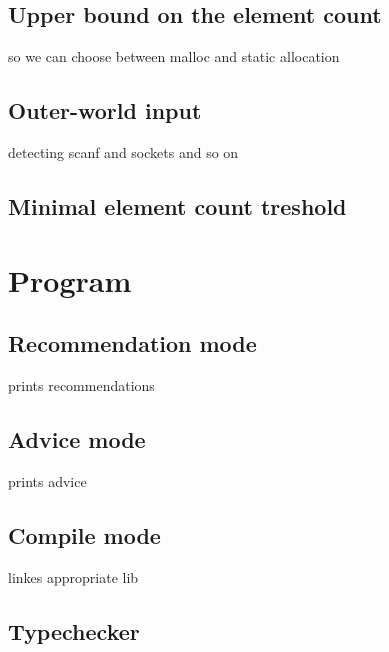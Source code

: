 \documentclass[11pt]{article}
\begin{document}
	\subsection{Upper bound on the element count}
		so we can choose between malloc and static allocation
	\subsection{Outer-world input}
		detecting scanf and sockets and so on
	\subsection{Minimal element count treshold}

\section{Program}
	\subsection{Recommendation mode}
		prints recommendations 
	\subsection{Advice mode}
		prints advice
	\subsection{Compile mode}
		linkes appropriate lib
	\subsection{Typechecker}
\end{document}
